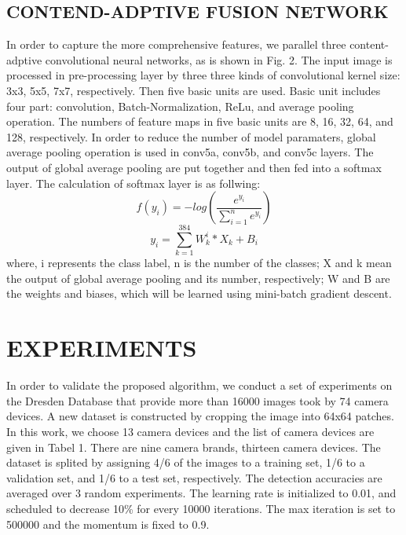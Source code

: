 \documentclass{article}
\begin{document}
\label{sssec:subsubhead}
\subsection{CONTEND-ADPTIVE FUSION NETWORK}
\label{sssec:subsubhead}
In order to capture the more comprehensive features, we parallel three content-adptive convolutional neural networks, as is shown in Fig. 2. The input image is processed in pre-processing layer by three three kinds of convolutional kernel size: 3x3, 5x5, 7x7, respectively. Then five basic units are used. Basic unit includes four part: convolution, Batch-Normalization, ReLu, and average pooling operation. The numbers of feature maps in five basic units are 8, 16, 32, 64, and 128, respectively. In order to reduce the number of model paramaters, global average pooling operation is used in conv5a, conv5b, and conv5c layers. The output of global average pooling are put together and then fed into a softmax layer. The calculation of softmax layer is as follwing:
\begin{equation}\label{key}
f(y_{i})=-log(\dfrac{e^{y_{i}}}{\sum_{i=1}^{n}e^{y_{i}}})
\end{equation}
\begin{equation}\label{key}
y_{i}=\sum_{k=1}^{384} W_{k}^{i}*X_{k}+B_{i}
\end{equation}
where, i represents the class label, n is the number of the classes; X and k mean the output of global average pooling and its number, respectively; W and B are the weights and biases, which will be learned using mini-batch gradient descent. 


\section{EXPERIMENTS}
\label{sec:typestyle}
In order to validate the proposed algorithm, we conduct a set of experiments on the Dresden Database that provide more than 16000 images took by 74 camera devices. A new dataset is constructed by cropping the image into 64x64 patches. In this work, we choose 13 camera devices and the list of camera devices are given in Tabel 1. There are nine camera brands, thirteen camera devices. The dataset is splited by assigning 4/6 of the images to a training set, 1/6 to a validation set, and 1/6 to a test set, respectively. The detection accuracies are averaged over 3 random experiments. The learning rate is initialized to 0.01, and scheduled to decrease 10\% for every 10000 iterations. The max iteration is set to 500000 and the momentum is fixed to 0.9. 
\end{document}
